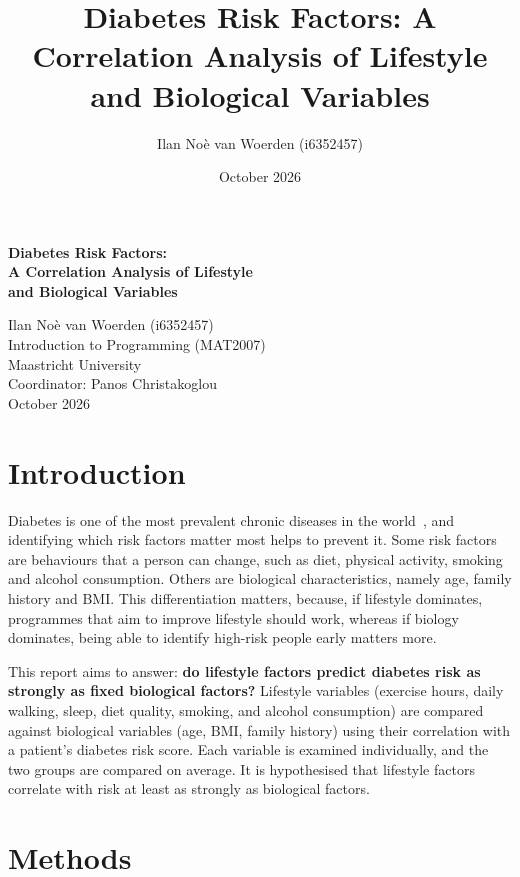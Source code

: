 \documentclass{article}
\title{Diabetes Risk Factors: A Correlation Analysis of Lifestyle and Biological Variables}
\author{Ilan Noè van Woerden (i6352457)}
\date{October 2026}
\begin{document}
 
\begin{titlepage}
  \vspace*{\fill}
  \begin{center}
    {\LARGE\bfseries Diabetes Risk Factors:\\[1ex]
     A Correlation Analysis of Lifestyle\\and Biological Variables\par}
  \end{center}
  \vspace*{\fill}
  \begin{flushright}
    Ilan Noè van Woerden (i6352457)\\
    Introduction to Programming (MAT2007)\\
    Maastricht University\\
    Coordinator: Panos Christakoglou\\
    October 2026
  \end{flushright}
\end{titlepage}

\section{Introduction}
Diabetes is one of the most prevalent chronic diseases in the world~\cite{who}, and identifying which risk factors matter most helps to prevent it. Some risk factors are behaviours that a person can change, such as diet, physical activity, smoking and alcohol consumption. Others are biological characteristics, namely age, family history and BMI. This differentiation matters, because, if lifestyle dominates, programmes that aim to improve lifestyle should work, whereas if biology dominates, being able to identify high-risk people early matters more.

This report aims to answer: \textbf{do lifestyle factors predict diabetes risk as strongly as fixed biological factors?} Lifestyle variables (exercise hours, daily walking, sleep, diet quality, smoking, and alcohol consumption) are compared against biological variables (age, BMI, family history) using their correlation with a patient's diabetes risk score. Each variable is examined individually, and the two groups are compared on average. It is hypothesised that lifestyle factors correlate with risk at least as strongly as biological factors.

\section{Methods}
\end{document}
